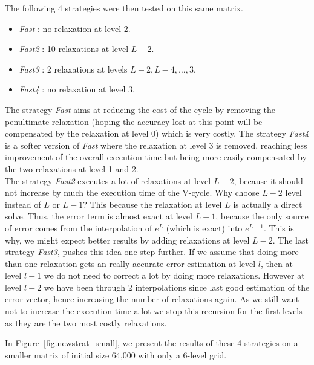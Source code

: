 \documentclass[a4paper,10pt]{article}
\begin{document}
 The following 4 strategies were then tested on this same matrix.
  \begin{itemize}
   \item \emph{Fast} : no relaxation at level 2.
   \item \emph{Fast2} : 10 relaxations at level $L-2$.
   \item \emph{Fast3} : 2 relaxations at levels $L-2,L-4,\dots,3$.
   \item \emph{Fast4} : no relaxation at level 3.
  \end{itemize}
  The strategy \emph{Fast} aims at reducing the cost of the cycle by removing the penultimate relaxation (hoping the accuracy lost at this point will be compensated by the relaxation at level 0) which is very costly.
  The strategy \emph{Fast4} is a softer version of \emph{Fast} where the relaxation at level 3 is removed, reaching less improvement of the overall execution time but being more easily compensated by the two relaxations at level 1 and 2.\\
  The strategy \emph{Fast2} executes a lot of relaxations at level $L-2$, because it should not increase by much the execution time of the V-cycle. Why choose $L-2$ level instead of $L$ or $L-1$?
  This because the relaxation at level $L$ is actually a direct solve. Thus, the error term is almost exact at level $L-1$, because the only source of error
  comes from the interpolation of $e^L$ (which is exact) into $e^{L-1}$. This is why, we might expect better results by adding relaxations at level $L-2$.
  The last strategy \emph{Fast3}, pushes this idea one step further. If we assume that doing more than one relaxation gets an really accurate error estimation at level $l$, then
  at level $l-1$ we do not need to correct a lot by doing more relaxations. However at level $l-2$ we have been through 2 interpolations since last good estimation of the error vector, hence increasing the number of relaxations again.
  As we still want not to increase the execution time a lot we stop this recursion for the first levels as they are the two most costly relaxations.
  
  In Figure~\ref{fig.newstrat_small}, we present the results of these 4 strategies on a smaller matrix of initial size 64,000 with only a 6-level grid.
  
\end{document}
